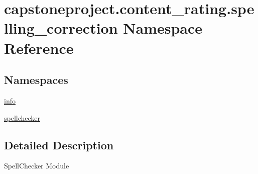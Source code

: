 \hypertarget{namespacecapstoneproject_1_1content__rating_1_1spelling__correction}{}\section{capstoneproject.\+content\+\_\+rating.\+spelling\+\_\+correction Namespace Reference}
\label{namespacecapstoneproject_1_1content__rating_1_1spelling__correction}
\subsection*{Namespaces}
\begin{DoxyCompactItemize}
\item 
 \mbox{\hyperlink{namespacecapstoneproject_1_1content__rating_1_1spelling__correction_1_1info}{info}}
\item 
 \mbox{\hyperlink{namespacecapstoneproject_1_1content__rating_1_1spelling__correction_1_1spellchecker}{spellchecker}}
\end{DoxyCompactItemize}


\subsection{Detailed Description}
\begin{DoxyVerb}SpellChecker Module \end{DoxyVerb}
 